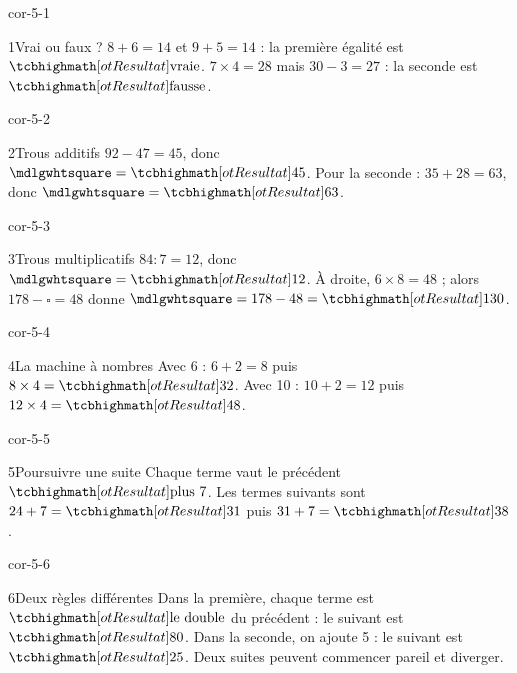 \clearpage\pagestyle{otMain}\setlength{\otBlocEspacement}{2.5mm}\fontsize{11}{15}\selectfont{}
\begin{blocLivre}{cor-5-1}\begin{corrige}{1}{Vrai ou faux ?}
$8+6=14$ et $9+5=14$ : la première égalité est $\res{\text{vraie}}$. $7\times4=28$ mais $30-3=27$ : la seconde est $\res{\text{fausse}}$.
\end{corrige}\end{blocLivre}
\begin{blocLivre}{cor-5-2}\begin{corrige}{2}{Trous additifs}
$92-47=45$, donc $\square=\res{45}$. Pour la seconde : $35+28=63$, donc $\square=\res{63}$.
\end{corrige}\end{blocLivre}
\begin{blocLivre}{cor-5-3}\begin{corrige}{3}{Trous multiplicatifs}
$84:7=12$, donc $\square=\res{12}$. À droite, $6\times8=48$ ; alors $178-\square=48$ donne $\square=178-48=\res{130}$.
\end{corrige}\end{blocLivre}
\begin{blocLivre}{cor-5-4}\begin{corrige}{4}{La machine à nombres}
Avec 6 : $6+2=8$ puis $8\times4=\res{32}$. Avec 10 : $10+2=12$ puis $12\times4=\res{48}$.
\label{fig-cor-5-4}
\end{corrige}\end{blocLivre}
\begin{blocLivre}{cor-5-5}\begin{corrige}{5}{Poursuivre une suite}
Chaque terme vaut le précédent $\res{\text{plus }7}$. Les termes suivants sont $24+7=\res{31}$ puis $31+7=\res{38}$.
\end{corrige}\end{blocLivre}
\begin{blocLivre}{cor-5-6}\begin{corrige}{6}{Deux règles différentes}
Dans la première, chaque terme est $\res{\text{le double}}$ du précédent : le suivant est $\res{80}$. Dans la seconde, on ajoute 5 : le suivant est $\res{25}$. Deux suites peuvent commencer pareil et diverger.
\end{corrige}\end{blocLivre}
